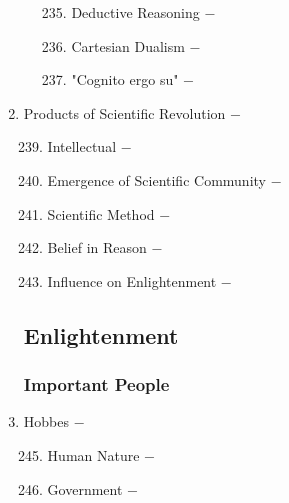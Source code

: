 \documentclass[12pt]{article}
\begin{document}
\begin{enumerate}
\begin{enumerate}[label=\arabic{*}.]
\begin{enumerate}[label=\arabic{*}.]
\setcounter{enumiii}{234}

\item Deductive Reasoning $-$ 

\item Cartesian Dualism $-$

\item "Cognito ergo su" $-$ 

\end{enumerate}

\end{enumerate}
\setcounter{enumi}{237}

\item Products of Scientific Revolution $-$

\begin{enumerate}[label=\arabic{*}.]
\setcounter{enumii}{238}

\item Intellectual $-$ 

\item Emergence of Scientific Community $-$

\item Scientific Method $-$ 

\item Belief in Reason $-$

\item Influence on Enlightenment $-$

\end{enumerate}
\setcounter{enumi}{243}
\subsection{Enlightenment}

\subsubsection{Important People}

\item Hobbes $-$ 

\begin{enumerate}[label=\arabic{*}.]
\setcounter{enumii}{244}

\item Human Nature $-$ 

\item Government $-$

\end{enumerate}
\setcounter{enumi}{246}


\end{enumerate}
\end{document}
